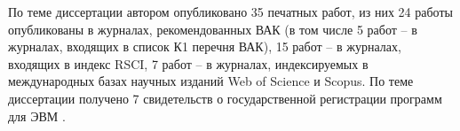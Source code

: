 По теме диссертации автором опубликовано 35 печатных работ, из них 24 работы опубликованы в журналах, рекомендованных ВАК\label{abbr:vak-1} (в том числе 5 работ -- в журналах, входящих в список К1 перечня ВАК), 15 работ -- в журналах, входящих в индекс RSCI\label{abbr:rsci-1}, 7 работ -- в журналах, индексируемых в международных базах научных изданий Web of Science и Scopus.
По теме диссертации получено 7 свидетельств о государственной регистрации программ для ЭВМ \cite{CertGoryachev2023Crys,CertGoryachev2020Crys,CertRybakov2021PrepUnstruct,CertRybakov2020PrepStruct,CertRybakov2024Surf,CertRybakov2023Mon,CertRybakov2019AVX}.




